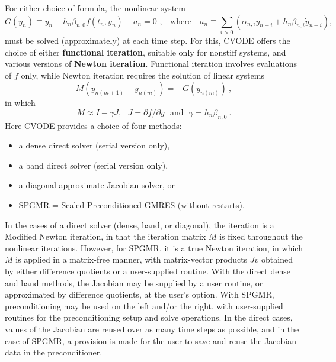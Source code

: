 For either choice of formula, the nonlinear system
\begin{equation}
G(y_n) \equiv y_n - h_n \beta_{n,0} f(t_n,y_n) - a_n = 0
  \mbox{~,~~~where~~~} a_n \equiv  
  \sum_{i>0}(\alpha_{n,i} y_{n-i} + h_n \beta_{n,i} \dot{y}_{n-i}),
\label{NLS}
\end{equation}
must be solved (approximately) at each time step.  For this, CVODE
offers the choice of either {\bf functional iteration}, suitable only
for nonstiff systems, and various versions of {\bf Newton iteration}.
Functional iteration involves evaluations of $f$ only, while Newton
iteration requires the solution of linear systems
\begin{equation} M (y_{n(m+1)} - y_{n(m)}) = -G(y_{n(m)}) ~,
\label{Newtoncorr} \end{equation}
in which
\begin{equation} M \approx I - \gamma J, ~~~J = \partial f / \partial y 
                 ~~~ \mbox{and} ~~~\gamma = h_n \beta_{n,0} ~. 
\label{Newtonmat} \end{equation}
Here CVODE provides a choice of four methods:
\vspace*{-.19in}
\begin{itemize}
\item a dense direct solver (serial version only),
\item a band direct solver (serial version only),
\item a diagonal approximate Jacobian solver, or
\item SPGMR = Scaled Preconditioned GMRES (without restarts).
\end{itemize}
In the cases of a direct solver (dense, band, or diagonal), the
iteration is a Modified Newton iteration, in that the iteration matrix
$M$ is fixed throughout the nonlinear iterations.  However, for SPGMR,
it is a true Newton iteration, in which $M$ is applied in a
matrix-free manner, with matrix-vector products $Jv$ obtained by
either difference quotients or a user-supplied routine.  With the
direct dense and band methods, the Jacobian may be supplied by a user
routine, or approximated by difference quotients, at the user's
option.  With SPGMR, preconditioning may be used on the left and/or
the right, with user-supplied routines for the preconditioning setup
and solve operations.  In the direct cases, values of the Jacobian are
reused over as many time steps as possible, and in the case of SPGMR,
a provision is made for the user to save and reuse the Jacobian data
in the preconditioner.

